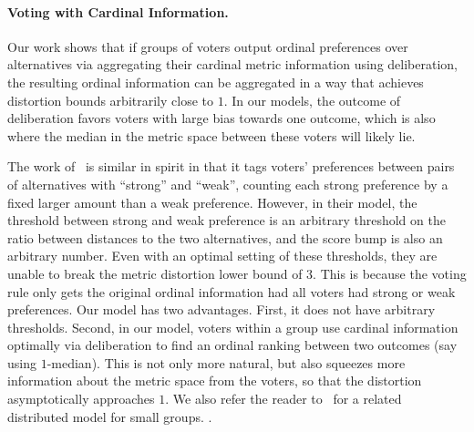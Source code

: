 \paragraph{Voting with Cardinal Information.} Our work shows that if groups of voters output ordinal preferences over alternatives via aggregating their cardinal metric information using deliberation, the resulting ordinal information can be aggregated in a way that achieves distortion bounds arbitrarily close to $1$. In our models, the outcome of deliberation favors voters with large bias towards one outcome, which is also where the median in the metric space between these voters will likely lie. 

The work of~\cite{Strength} is similar in spirit in that it tags voters' preferences between pairs of alternatives with ``strong'' and ``weak'', counting each strong preference by a fixed larger amount than a weak preference.  However, in their model, the threshold between strong and weak preference is an arbitrary threshold on the ratio between distances to the two alternatives, and the score bump is also an arbitrary number. Even with an optimal setting of these thresholds, they are unable to break the metric distortion lower bound of $3$. This is because the voting rule only gets the original ordinal information had all voters had strong or weak preferences.  Our model has two advantages. First, it does not have arbitrary thresholds. Second, in our model, voters within a group use cardinal information optimally via deliberation  to find an ordinal ranking between two outcomes (say using $1$-median). This is not only more natural, but also squeezes more information about the metric space from the voters, so that the distortion asymptotically approaches $1$.  We also refer the reader to~\cite{Distributed} for a related distributed model for small groups. . %

